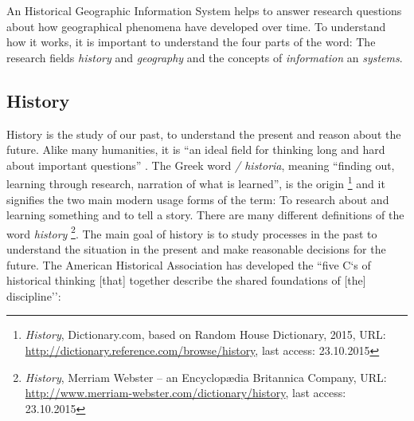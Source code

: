 An Historical Geographic Information System helps to answer research questions about how geographical phenomena have developed over time. To understand how it works, it is important to understand the four parts of the word: The research fields \emph{history} and \emph{geography} and the concepts of \emph{information} an \emph{systems}.


\subsection{History} %
\label{sub:history}

History is the study of our past, to understand the present and reason about the future. Alike many humanities, it is ``an ideal field for thinking long and hard about important questions''
\cite{ahaFiveCs}.
The Greek word \emph{\textIota\textsigma\texttau\textomikron\textrho\textiota\textalpha / historia}, meaning ``finding out, learning through research, narration of what is learned'', is the origin
\footnote{
  \emph{History},
  Dictionary.com, based on Random House Dictionary, 2015,
  URL: \url{http://dictionary.reference.com/browse/history},
  last access: 23.10.2015
}
and it signifies the two main modern usage forms of the term: To research about and learning something and to tell a story. There are many different definitions of the word \emph{history}
\footnote{
  \emph{History},
  Merriam Webster -- an Encyclopædia Britannica Company,
  URL: \url{http://www.merriam-webster.com/dictionary/history},
  last access: 23.10.2015
}.
The main goal of history is to study processes in the past to understand the situation in the present and make reasonable decisions for the future. The American Historical Association has developed the ``five C`s of historical thinking [that] together describe the shared foundations of [the] discipline''\cite{ahaFiveCs}:

